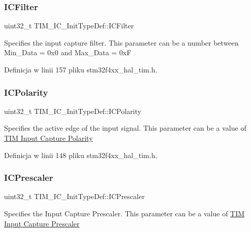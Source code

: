 \subsubsection{\texorpdfstring{I\+C\+Filter}{ICFilter}}
{\footnotesize\ttfamily uint32\+\_\+t T\+I\+M\+\_\+\+I\+C\+\_\+\+Init\+Type\+Def\+::\+I\+C\+Filter}

Specifies the input capture filter. This parameter can be a number between Min\+\_\+\+Data = 0x0 and Max\+\_\+\+Data = 0xF 

Definicja w linii 157 pliku stm32f4xx\+\_\+hal\+\_\+tim.\+h.

\mbox{\label{struct_t_i_m___i_c___init_type_def_ab122383ebc0926c49a814546471da9b3}} 
\subsubsection{\texorpdfstring{I\+C\+Polarity}{ICPolarity}}
{\footnotesize\ttfamily uint32\+\_\+t T\+I\+M\+\_\+\+I\+C\+\_\+\+Init\+Type\+Def\+::\+I\+C\+Polarity}

Specifies the active edge of the input signal. This parameter can be a value of \hyperlink{group___t_i_m___input___capture___polarity}{T\+IM Input Capture Polarity} 

Definicja w linii 148 pliku stm32f4xx\+\_\+hal\+\_\+tim.\+h.

\mbox{\label{struct_t_i_m___i_c___init_type_def_a452a4a459b6f7b7c478db032de9b0d72}} 
\subsubsection{\texorpdfstring{I\+C\+Prescaler}{ICPrescaler}}
{\footnotesize\ttfamily uint32\+\_\+t T\+I\+M\+\_\+\+I\+C\+\_\+\+Init\+Type\+Def\+::\+I\+C\+Prescaler}

Specifies the Input Capture Prescaler. This parameter can be a value of \hyperlink{group___t_i_m___input___capture___prescaler}{T\+IM Input Capture Prescaler} 

